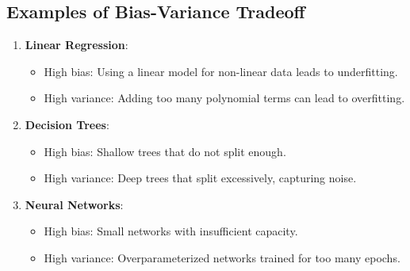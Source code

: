 \subsection*{Examples of Bias-Variance Tradeoff}
\begin{enumerate}
    \item \textbf{Linear Regression}:
    \begin{itemize}
        \item High bias: Using a linear model for non-linear data leads to underfitting.
        \item High variance: Adding too many polynomial terms can lead to overfitting.
    \end{itemize}
    
    \item \textbf{Decision Trees}:
    \begin{itemize}
        \item High bias: Shallow trees that do not split enough.
        \item High variance: Deep trees that split excessively, capturing noise.
    \end{itemize}

    \item \textbf{Neural Networks}:
    \begin{itemize}
        \item High bias: Small networks with insufficient capacity.
        \item High variance: Overparameterized networks trained for too many epochs.
    \end{itemize}
\end{enumerate}


